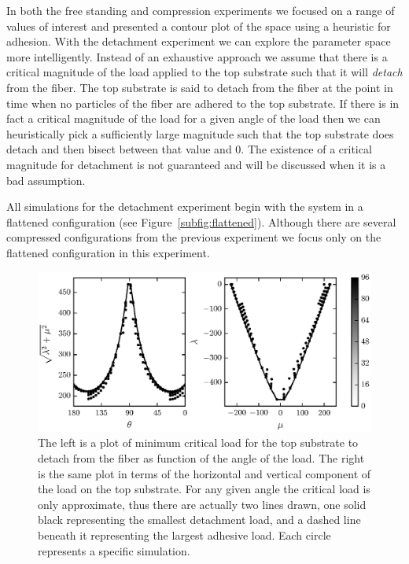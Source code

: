 In both the free standing and compression experiments we focused on a range of values of interest and presented a contour plot of the space using a heuristic for adhesion. With the detachment experiment we can explore the parameter space more intelligently. Instead of an exhaustive approach we assume that there is a critical magnitude of the load applied to the top substrate such that it will \textit{detach} from the fiber. The top substrate is said to detach from the fiber at the point in time when no particles of the fiber are adhered to the top substrate. If there is in fact a critical magnitude of the load for a given angle of the load then we can heuristically pick a sufficiently large magnitude such that the top substrate does detach and then bisect between that value and $0$. The existence of a critical magnitude for detachment is not guaranteed and will be discussed when it is a bad assumption.

All simulations for the detachment experiment begin with the system in a flattened configuration (see Figure~\ref{subfig:flattened}). Although there are several compressed configurations from the previous experiment we focus only on the flattened configuration in this experiment.
   
   \begin{figure}[t]
      \begin{center}
         \includegraphics{./fig/ch3/pull/ref/grid.eps}
      \end{center}      
      \caption{The left is a plot of minimum critical load for the top substrate to detach from the fiber as function of the angle of the load. The right is the same plot in terms of the horizontal and vertical component of the load on the top substrate. For any given angle the critical load is only approximate, thus there are actually two lines drawn, one solid black representing the smallest detachment load, and a dashed line beneath it representing the largest adhesive load. Each circle represents a specific simulation.
      \label{fig:pull:ref}}
   \end{figure}

